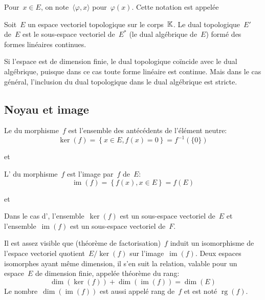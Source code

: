 \medskip
Pour~$x \in E$, on note~$\langle\varphi,x\rangle$ pour~$\varphi(x)$.
Cette notation est appelée 

\medskip
\begin{definition}
Soit~$E$ un espace vectoriel topologique sur le corps~$\mathbb K$.
Le dual topologique~$E'$ de~$E$ est le sous-espace vectoriel de~$E^*$ (le dual algébrique de~$E$) formé des formes linéaires continues.
\end{definition}
Si l'espace est de dimension finie, le dual topologique coïncide avec le dual algébrique, puisque dans ce cas toute forme linéaire est continue.
Mais dans le cas général, l'inclusion du dual topologique dans le dual algébrique est stricte.

\medskip
\subsection{Noyau et image}

\begin{definition}[Noyau]
Le  du morphisme~$f$ est l'ensemble des antécédents de l'élément neutre:
\begin{equation}
  \ker(f)=\left\{x\in E, f(x)=0\right\}=f^{-1}(\{0\})\end{equation}
\end{definition}
et 

\medskip
\begin{definition}[Image]
L' du morphisme~$f$ est l'image par~$f$ de~$E$:
\begin{equation}
 \operatorname{im}(f)=\left\{ f(x), x\in E\right\}=f(E)\end{equation}
\end{definition}
et 

\medskip
Dans le cas d',
l'ensemble~$\ker(f)$ est un sous-espace vectoriel de~$E$ et
l'ensemble~$\operatorname{im}(f)$ est un sous-espace vectoriel de~$F$.

\begin{theoreme}
Il est assez visible que (théorème de factorisation)~$f$ induit un isomorphisme de l'espace vectoriel quotient~$E/\ker(f)$ sur l'image~$\operatorname{im}(f)$.
Deux espaces isomorphes ayant même dimension, il s'en suit la relation, valable pour un espace~$E$ de dimension finie, appelée théorème du rang:
\begin{equation}
  \dim(\ker(f)) + \dim(\operatorname{im}(f)) = \dim( E )
\end{equation}
Le nombre~$\dim(\operatorname{im}(f))$ est aussi appelé rang de~$f$ et est noté
$\operatorname{rg}(f)$.
\end{theoreme}

